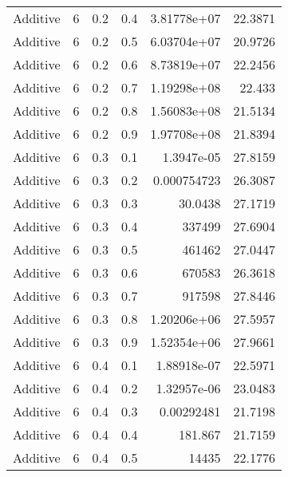 \documentclass{article}
\begin{document}
\begin{longtable}[H]{lrrrrr}
 Additive       &       6 &   0.2 &            0.4 &      3.81778e+07 &         22.3871 \\
 Additive       &       6 &   0.2 &            0.5 &      6.03704e+07 &         20.9726 \\
 Additive       &       6 &   0.2 &            0.6 &      8.73819e+07 &         22.2456 \\
 Additive       &       6 &   0.2 &            0.7 &      1.19298e+08 &         22.433  \\
 Additive       &       6 &   0.2 &            0.8 &      1.56083e+08 &         21.5134 \\
 Additive       &       6 &   0.2 &            0.9 &      1.97708e+08 &         21.8394 \\
 Additive       &       6 &   0.3 &            0.1 &      1.3947e-05  &         27.8159 \\
 Additive       &       6 &   0.3 &            0.2 &      0.000754723 &         26.3087 \\
 Additive       &       6 &   0.3 &            0.3 &     30.0438      &         27.1719 \\
 Additive       &       6 &   0.3 &            0.4 & 337499           &         27.6904 \\
 Additive       &       6 &   0.3 &            0.5 & 461462           &         27.0447 \\
 Additive       &       6 &   0.3 &            0.6 & 670583           &         26.3618 \\
 Additive       &       6 &   0.3 &            0.7 & 917598           &         27.8446 \\
 Additive       &       6 &   0.3 &            0.8 &      1.20206e+06 &         27.5957 \\
 Additive       &       6 &   0.3 &            0.9 &      1.52354e+06 &         27.9661 \\
 Additive       &       6 &   0.4 &            0.1 &      1.88918e-07 &         22.5971 \\
 Additive       &       6 &   0.4 &            0.2 &      1.32957e-06 &         23.0483 \\
 Additive       &       6 &   0.4 &            0.3 &      0.00292481  &         21.7198 \\
 Additive       &       6 &   0.4 &            0.4 &    181.867       &         21.7159 \\
 Additive       &       6 &   0.4 &            0.5 &  14435           &         22.1776 \\

\end{longtable}
\end{document}
